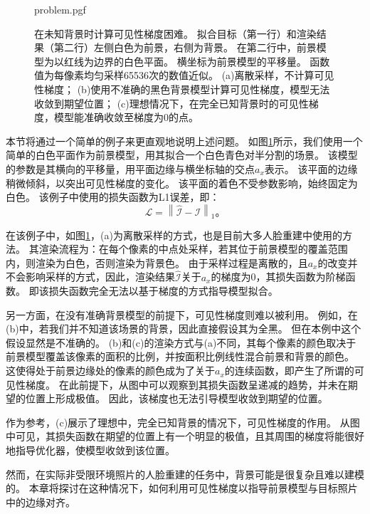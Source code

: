 \begin{figure}
    \centering
    {problem.pgf}
    \caption[在未知背景时计算可见性梯度困难]{
        在未知背景时计算可见性梯度困难。
        拟合目标（第一行）和渲染结果（第二行）左侧白色为前景，右侧为背景。
        在第二行中，前景模型为以红线为边界的白色平面。
        横坐标为前景模型的平移量。
        函数值为每像素均匀采样65536次的数值近似。
        (a)离散采样，不计算可见性梯度；
        (b)使用不准确的黑色背景模型计算可见性梯度，模型无法收敛到期望位置；
        (c)理想情况下，在完全已知背景时的可见性梯度，模型能准确收敛至梯度为0的点。
    }
    \label{fig:problem}
\end{figure}
本节将通过一个简单的例子来更直观地说明上述问题。
如图\ref{fig:problem}所示，我们使用一个简单的白色平面作为前景模型，用其拟合一个白色青色对半分割的场景。
该模型的参数是其横向的平移量，用平面边缘与横坐标轴的交点$a_x$表示。
该平面的边缘稍微倾斜，以突出可见性梯度的变化。
该平面的着色不受参数影响，始终固定为白色。
该例子中使用的损失函数为L1误差，即：
\begin{equation}
\mathcal{L} = \left\| \hat{\mathcal{I}} - \mathcal{I} \right\|_1
\text{。}
\label{eq:loss_l1}
\end{equation}

在该例子中，如图\ref{fig:problem}，(a)为离散采样的方式，也是目前大多人脸重建中使用的方法。
其渲染流程为：在每个像素的中点处采样，若其位于前景模型的覆盖范围内，则渲染为白色，否则渲染为背景色。
由于采样过程是离散的，且$a_x$的改变并不会影响采样的方式，因此，渲染结果$\hat{\mathcal{I}}$关于$a_x$的梯度为0，其损失函数为阶梯函数。
即该损失函数完全无法以基于梯度的方式指导模型拟合。

另一方面，在没有准确背景模型的前提下，可见性梯度则难以被利用。
例如，在(b)中，若我们并不知道该场景的背景，因此直接假设其为全黑。
但在本例中这个假设显然是不准确的。
(b)和(c)的渲染方式与(a)不同，其每个像素的颜色取决于前景模型覆盖该像素的面积的比例，并按面积比例线性混合前景和背景的颜色。
这使得处于前景边缘处的像素的颜色成为了关于$a_x$的连续函数，即产生了所谓的可见性梯度。
在此前提下，从图中可以观察到其损失函数呈递减的趋势，并未在期望的位置上形成极值。
因此，该梯度也无法引导模型收敛到期望的位置。

作为参考，(c)展示了理想中，完全已知背景的情况下，可见性梯度的作用。
从图中可见，其损失函数在期望的位置上有一个明显的极值，且其周围的梯度将能很好地指导优化器，使模型收敛到该位置。

然而，在实际非受限环境照片的人脸重建的任务中，背景可能是很复杂且难以建模的。
本章将探讨在这种情况下，如何利用可见性梯度以指导前景模型与目标照片中的边缘对齐。

